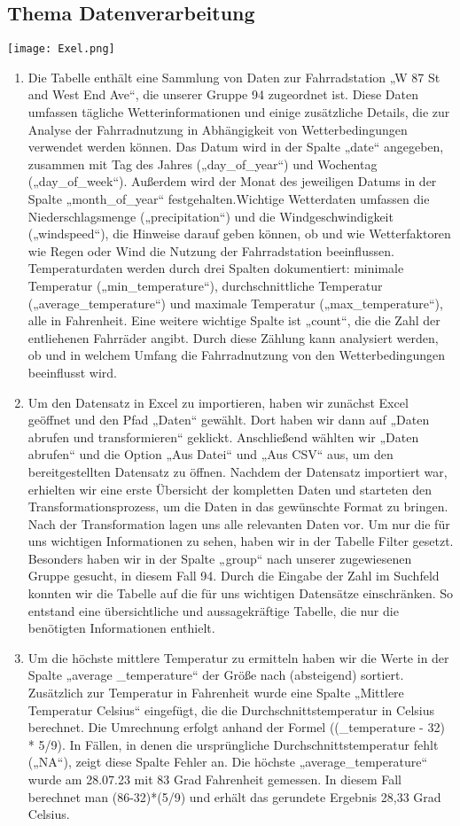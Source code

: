 \documentclass{article}
\begin{document}
\subsection{Thema Datenverarbeitung}
\texttt{[image: Exel.png]}
\begin{enumerate}
 \item Die Tabelle enthält eine Sammlung von Daten zur Fahrradstation „W 87 St and West End Ave“, die unserer Gruppe 94 zugeordnet ist. Diese Daten umfassen tägliche Wetterinformationen und einige zusätzliche Details, die zur Analyse der Fahrradnutzung in Abhängigkeit von Wetterbedingungen verwendet werden können.
Das Datum wird in der Spalte „date“ angegeben, zusammen mit Tag des Jahres („day\_of\_year“) und Wochentag („day\_of\_week“). Außerdem wird der Monat des jeweiligen Datums in der Spalte „month\_of\_year“ festgehalten.Wichtige Wetterdaten umfassen die Niederschlagsmenge („precipitation“) und die Windgeschwindigkeit („windspeed“), die Hinweise darauf geben können, ob und wie Wetterfaktoren wie Regen oder Wind die Nutzung der Fahrradstation beeinflussen. Temperaturdaten werden durch drei Spalten dokumentiert: minimale Temperatur („min\_temperature“), durchschnittliche Temperatur („average\_temperature“) und maximale Temperatur („max\_temperature“), alle in Fahrenheit. 
Eine weitere wichtige Spalte ist „count“, die die Zahl der entliehenen Fahrräder angibt. Durch diese Zählung kann analysiert werden, ob und in welchem Umfang die Fahrradnutzung von den Wetterbedingungen beeinflusst wird.
\item Um den Datensatz in Excel zu importieren, haben wir zunächst Excel geöffnet und den Pfad „Daten“ gewählt. Dort haben wir dann auf „Daten abrufen und transformieren“ geklickt. Anschließend wählten wir „Daten abrufen“ und die Option „Aus Datei“ und „Aus CSV“ aus, um den bereitgestellten Datensatz zu öffnen.
Nachdem der Datensatz importiert war, erhielten wir eine erste Übersicht der kompletten Daten und starteten den Transformationsprozess, um die Daten in das gewünschte Format zu bringen. Nach der Transformation lagen uns alle relevanten Daten vor.
Um nur die für uns wichtigen Informationen zu sehen, haben wir in der Tabelle Filter gesetzt. Besonders haben wir in der Spalte „group“ nach unserer zugewiesenen Gruppe gesucht, in diesem Fall 94. Durch die Eingabe der Zahl im Suchfeld konnten wir die Tabelle auf die für uns wichtigen Datensätze einschränken. So entstand eine übersichtliche und aussagekräftige Tabelle, die nur die benötigten Informationen enthielt.
\item Um die höchste mittlere Temperatur zu ermitteln haben wir die Werte in der Spalte „average _temperature“ der Größe nach (absteigend) sortiert. 
Zusätzlich zur Temperatur in Fahrenheit wurde eine Spalte „Mittlere Temperatur Celsius“ eingefügt, die die Durchschnittstemperatur in Celsius berechnet. Die Umrechnung erfolgt anhand der Formel ((\_temperature - 32) * 5/9). In Fällen, in denen die ursprüngliche Durchschnittstemperatur fehlt („NA“), zeigt diese Spalte Fehler an. Die höchste „average\_temperature“ wurde am 28.07.23 mit 83 Grad Fahrenheit gemessen. In diesem Fall berechnet man (86-32)*(5/9) und erhält das gerundete Ergebnis 28,33 Grad Celsius.
\end{enumerate}
\newpage




\end{document}
